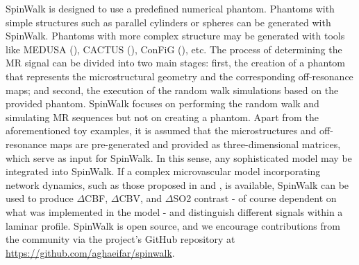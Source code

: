 SpinWalk is designed to use a predefined numerical phantom. Phantoms with simple structures such as parallel cylinders or spheres can be generated with SpinWalk. Phantoms with more complex structure may be generated with tools like MEDUSA (\cite{ginsburger2019medusa}), CACTUS (\cite{villarreal2023cactus}), ConFiG (\cite{callaghan2020config}), etc. The process of determining the MR signal can be divided into two main stages: first, the creation of a phantom that represents the microstructural geometry and the corresponding off-resonance maps; and second, the execution of the random walk simulations based on the provided phantom. SpinWalk focuses on performing the random walk and simulating MR sequences but not on creating a phantom. Apart from the aforementioned toy examples, it is assumed that the microstructures and off-resonance maps are pre-generated and provided as three-dimensional matrices, which serve as input for SpinWalk. In this sense, any sophisticated model may be integrated into SpinWalk. If a complex microvascular model incorporating network dynamics, such as those proposed in \cite{baez2023mechanistic} and \cite{hartung2021mathematical}, is available, SpinWalk can be used to produce $\Delta$CBF, $\Delta$CBV, and $\Delta$SO2 contrast - of course dependent on what was implemented in the model - and distinguish different signals within a laminar profile. SpinWalk is open source, and we encourage contributions from the community via the project's GitHub repository at \url{https://github.com/aghaeifar/spinwalk}. 

